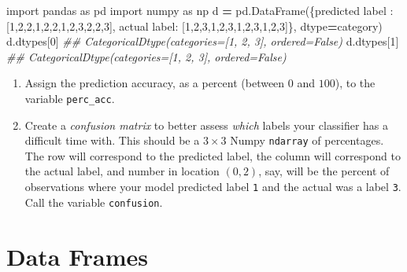 \documentclass[
  12pt,
  krantz2]{krantz}
\makeatletter
\newenvironment{Shaded}{\begin{snugshade}}{\end{snugshade}}
\newcommand{\CommentTok}[1]{\textcolor[rgb]{0.37,0.37,0.37}{\textit{#1}}}
\newcommand{\DecValTok}[1]{\textcolor[rgb]{0.06,0.06,0.06}{#1}}
\newcommand{\ImportTok}[1]{#1}
\newcommand{\NormalTok}[1]{#1}
\newcommand{\OperatorTok}[1]{\textcolor[rgb]{0.43,0.43,0.43}{\textbf{#1}}}
\newcommand{\StringTok}[1]{\textcolor[rgb]{0.5,0.5,0.5}{#1}}
\providecommand{\tightlist}{%
  \setlength{\itemsep}{0pt}\setlength{\parskip}{0pt}}
\newenvironment{kframe}{%
\medskip{}
\setlength{\fboxsep}{.8em}
 \def\at@end@of@kframe{}%
 \ifinner\ifhmode%
  \def\at@end@of@kframe{\end{minipage}}%
  \begin{minipage}{\columnwidth}%
 \fi\fi%
 \def\FrameCommand##1{\hskip\@totalleftmargin \hskip-\fboxsep
 \colorbox{shadecolor}{##1}\hskip-\fboxsep
     \hskip-\linewidth \hskip-\@totalleftmargin \hskip\columnwidth}%
 \MakeFramed {\advance\hsize-\width
   \@totalleftmargin\z@ \linewidth\hsize
   \@setminipage}}%
 {\par\unskip\endMakeFramed%
 \at@end@of@kframe}
\renewenvironment{Shaded}{\begin{kframe}}{\end{kframe}}
\makeatother
\begin{document}
\begin{Shaded}
\begin{Highlighting}[]
\ImportTok{import}\NormalTok{ pandas }\ImportTok{as}\NormalTok{ pd}
\ImportTok{import}\NormalTok{ numpy }\ImportTok{as}\NormalTok{ np}
\NormalTok{d }\OperatorTok{=}\NormalTok{ pd.DataFrame(\{}\StringTok{\textquotesingle{}predicted label\textquotesingle{}}\NormalTok{ : [}\DecValTok{1}\NormalTok{,}\DecValTok{2}\NormalTok{,}\DecValTok{2}\NormalTok{,}\DecValTok{1}\NormalTok{,}\DecValTok{2}\NormalTok{,}\DecValTok{2}\NormalTok{,}\DecValTok{1}\NormalTok{,}\DecValTok{2}\NormalTok{,}\DecValTok{3}\NormalTok{,}\DecValTok{2}\NormalTok{,}\DecValTok{2}\NormalTok{,}\DecValTok{3}\NormalTok{], }
                  \StringTok{\textquotesingle{}actual label\textquotesingle{}}\NormalTok{: [}\DecValTok{1}\NormalTok{,}\DecValTok{2}\NormalTok{,}\DecValTok{3}\NormalTok{,}\DecValTok{1}\NormalTok{,}\DecValTok{2}\NormalTok{,}\DecValTok{3}\NormalTok{,}\DecValTok{1}\NormalTok{,}\DecValTok{2}\NormalTok{,}\DecValTok{3}\NormalTok{,}\DecValTok{1}\NormalTok{,}\DecValTok{2}\NormalTok{,}\DecValTok{3}\NormalTok{]\}, }
\NormalTok{                  dtype}\OperatorTok{=}\StringTok{\textquotesingle{}category\textquotesingle{}}\NormalTok{)}
\NormalTok{d.dtypes[}\DecValTok{0}\NormalTok{]}
\CommentTok{\#\# CategoricalDtype(categories=[1, 2, 3], ordered=False)}
\NormalTok{d.dtypes[}\DecValTok{1}\NormalTok{]}
\CommentTok{\#\# CategoricalDtype(categories=[1, 2, 3], ordered=False)}
\end{Highlighting}
\end{Shaded}

\begin{enumerate}
\def\labelenumi{\alph{enumi})}
\tightlist
\item
  Assign the prediction accuracy, as a percent (between \(0\) and \(100\)), to the variable \texttt{perc\_acc}.
\item
  Create a \emph{confusion matrix} to better assess \emph{which} labels your classifier has a difficult time with. This should be a \(3 \times 3\) Numpy \texttt{ndarray} of percentages. The row will correspond to the predicted label, the column will correspond to the actual label, and number in location \((0,2)\), say, will be the percent of observations where your model predicted label \texttt{1} and the actual was a label \texttt{3}. Call the variable \texttt{confusion}.
\end{enumerate}

\hypertarget{data-frames}{%
\chapter{Data Frames}\label{data-frames}}
\end{document}
